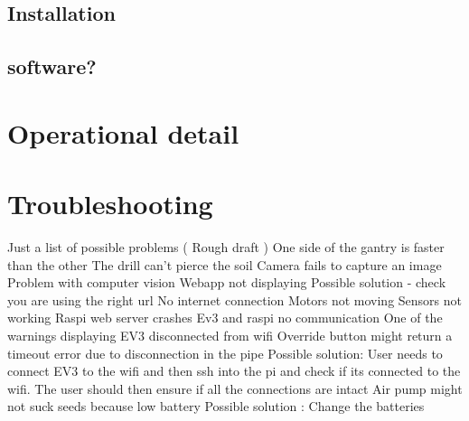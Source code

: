 \documentclass{article}
\begin{document}
\subsection{Installation}

\subsection{software?}


\section{Operational detail}\label{sec:detail}

\section{Troubleshooting}\label{sec:troubleshooting}
Just a list of possible problems ( Rough draft ) \newline
\newline
One side of the gantry is faster than the other \newline
The drill can’t pierce the soil \newline
Camera fails to capture an image \newline
Problem with computer vision \newline
Webapp not displaying \newline
Possible solution - check you are using the right url \newline
No internet connection \newline
Motors not moving \newline
Sensors not working \newline
Raspi web server crashes \newline
Ev3 and raspi no communication \newline
One of the warnings displaying \newline
EV3 disconnected from wifi \newline
Override button might return a timeout error due to disconnection in the pipe \newline
Possible solution: User needs to connect EV3 to the wifi and then ssh into the pi and check if its connected to the wifi. The user should then ensure if all the connections are intact \newline
Air pump might not suck seeds because low battery \newline
Possible solution : Change the batteries \newline






\end{document}
